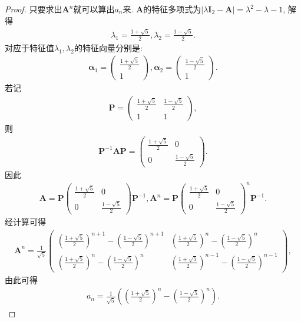 \documentclass[../../main.tex]{subfiles}%
\begin{document}
\begin{proof}
只要求出\(\boldsymbol{A}^{n}\)就可以算出\(a_{n}\)来. \(\boldsymbol{A}\)的特征多项式为\(\vert\lambda\boldsymbol{I}_{2}-\boldsymbol{A}\vert=\lambda^{2}-\lambda - 1\), 解得
\begin{align*}
\lambda_{1}=\frac{1 + \sqrt{5}}{2},\lambda_{2}=\frac{1 - \sqrt{5}}{2}.
\end{align*}
对应于特征值\(\lambda_{1},\lambda_{2}\)的特征向量分别是:
\begin{align*}
\boldsymbol{\alpha}_{1}=\begin{pmatrix}
\frac{1 + \sqrt{5}}{2}\\
1
\end{pmatrix},\boldsymbol{\alpha}_{2}=\begin{pmatrix}
\frac{1 - \sqrt{5}}{2}\\
1
\end{pmatrix}.
\end{align*}
若记
\begin{align*}
\boldsymbol{P}=\begin{pmatrix}
\frac{1 + \sqrt{5}}{2}&\frac{1 - \sqrt{5}}{2}\\
1&1
\end{pmatrix},
\end{align*}
则
\begin{align*}
\boldsymbol{P}^{-1}\boldsymbol{AP}=\begin{pmatrix}
\frac{1 + \sqrt{5}}{2}&0\\
0&\frac{1 - \sqrt{5}}{2}
\end{pmatrix}.
\end{align*}
因此
\begin{align*}
\boldsymbol{A}=\boldsymbol{P}\begin{pmatrix}
\frac{1 + \sqrt{5}}{2}&0\\
0&\frac{1 - \sqrt{5}}{2}
\end{pmatrix}\boldsymbol{P}^{-1},\boldsymbol{A}^{n}=\boldsymbol{P}\begin{pmatrix}
\frac{1 + \sqrt{5}}{2}&0\\
0&\frac{1 - \sqrt{5}}{2}
\end{pmatrix}^{n}\boldsymbol{P}^{-1}.
\end{align*}
经计算可得
\begin{align*}
\boldsymbol{A}^{n}=\frac{1}{\sqrt{5}}\begin{pmatrix}
\left(\frac{1 + \sqrt{5}}{2}\right)^{n + 1}-\left(\frac{1 - \sqrt{5}}{2}\right)^{n + 1}&\left(\frac{1 + \sqrt{5}}{2}\right)^{n}-\left(\frac{1 - \sqrt{5}}{2}\right)^{n}\\
\left(\frac{1 + \sqrt{5}}{2}\right)^{n}-\left(\frac{1 - \sqrt{5}}{2}\right)^{n}&\left(\frac{1 + \sqrt{5}}{2}\right)^{n - 1}-\left(\frac{1 - \sqrt{5}}{2}\right)^{n - 1}
\end{pmatrix},
\end{align*}
由此可得
\begin{align*}
a_{n}=\frac{1}{\sqrt{5}}\left(\left(\frac{1 + \sqrt{5}}{2}\right)^{n}-\left(\frac{1 - \sqrt{5}}{2}\right)^{n}\right).
\end{align*}
\end{proof}
\end{document}
